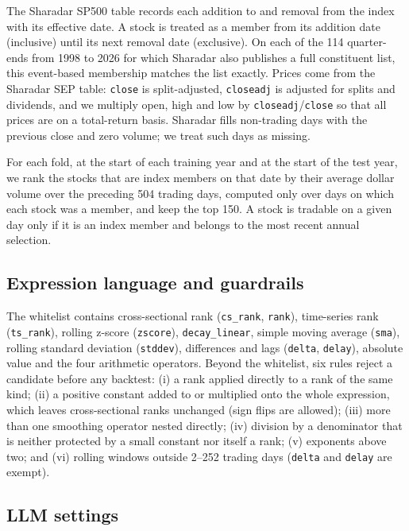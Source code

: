 \documentclass[preprint,12pt,authoryear]{elsarticle}
\begin{document}
The Sharadar SP500 table records each addition to and removal from the index with its effective date. A stock is treated as a member from its addition date (inclusive) until its next removal date (exclusive). On each of the 114 quarter-ends from 1998 to 2026 for which Sharadar also publishes a full constituent list, this event-based membership matches the list exactly. Prices come from the Sharadar SEP table: \texttt{close} is split-adjusted, \texttt{closeadj} is adjusted for splits and dividends, and we multiply open, high and low by \texttt{closeadj}/\texttt{close} so that all prices are on a total-return basis. Sharadar fills non-trading days with the previous close and zero volume; we treat such days as missing.

For each fold, at the start of each training year and at the start of the test year, we rank the stocks that are index members on that date by their average dollar volume over the preceding 504 trading days, computed only over days on which each stock was a member, and keep the top 150. A stock is tradable on a given day only if it is an index member and belongs to the most recent annual selection.

\subsection{Expression language and guardrails}\label{app:guardrails}

The whitelist contains cross-sectional rank (\texttt{cs\_rank}, \texttt{rank}), time-series rank (\texttt{ts\_rank}), rolling z-score (\texttt{zscore}), \texttt{decay\_linear}, simple moving average (\texttt{sma}), rolling standard deviation (\texttt{stddev}), differences and lags (\texttt{delta}, \texttt{delay}), absolute value and the four arithmetic operators. Beyond the whitelist, six rules reject a candidate before any backtest: (i) a rank applied directly to a rank of the same kind; (ii) a positive constant added to or multiplied onto the whole expression, which leaves cross-sectional ranks unchanged (sign flips are allowed); (iii) more than one smoothing operator nested directly; (iv) division by a denominator that is neither protected by a small constant nor itself a rank; (v) exponents above two; and (vi) rolling windows outside 2--252 trading days (\texttt{delta} and \texttt{delay} are exempt).

\subsection{LLM settings}\label{app:llm}
\end{document}
